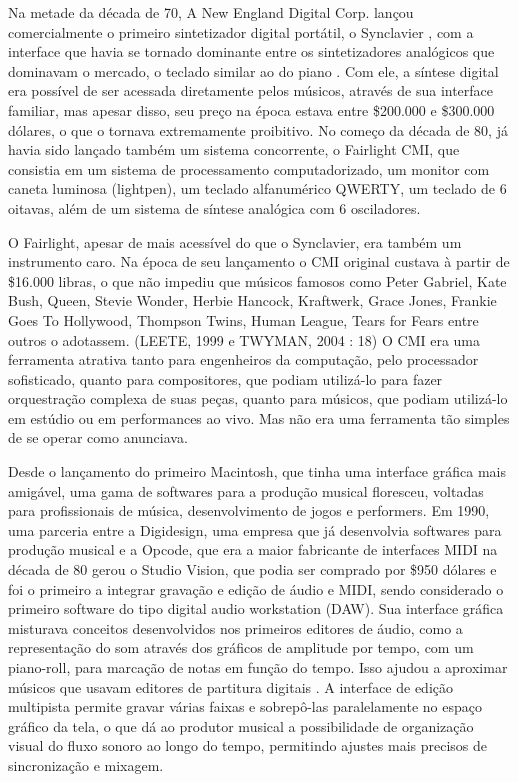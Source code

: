Na metade da década de 70, A New England Digital Corp. lançou comercialmente o primeiro sintetizador digital portátil, o Synclavier \cite[265]{Holmes1985}, com a interface que havia se tornado dominante entre os sintetizadores analógicos que dominavam o mercado, o teclado similar ao do piano \cite{JosephParadiso1998}. Com ele, a síntese digital era possível de ser acessada diretamente pelos músicos, através de sua interface familiar, mas apesar disso, seu preço na época estava entre \$200.000 e \$300.000 dólares, o que o tornava extremamente proibitivo. No começo da década de 80, já havia sido lançado também um sistema concorrente, o Fairlight CMI, que consistia em um sistema de processamento computadorizado, um monitor com caneta luminosa (lightpen), um teclado alfanumérico QWERTY, um teclado de 6 oitavas, além de um sistema de síntese analógica com 6 osciladores.

O Fairlight, apesar de mais acessível do que o Synclavier, era também um instrumento caro. Na época de seu lançamento o CMI original custava à partir de \$16.000 libras, o que não impediu que músicos famosos como Peter Gabriel, Kate Bush, Queen, Stevie Wonder, Herbie Hancock, Kraftwerk, Grace Jones, Frankie Goes To Hollywood, Thompson Twins, Human League, Tears for Fears entre outros o adotassem. \cite[18]{Twyman2004}(LEETE, 1999 e TWYMAN, 2004 : 18) O CMI era uma ferramenta atrativa tanto para engenheiros da computação, pelo processador sofisticado, quanto para compositores, que podiam utilizá-lo para fazer orquestração complexa de suas peças, quanto para músicos, que podiam utilizá-lo em estúdio ou em performances ao vivo. Mas não era uma ferramenta tão simples de se operar como anunciava. \cite[55]{Twyman2004}

Desde o lançamento do primeiro Macintosh, que tinha uma interface gráfica mais amigável, uma gama de softwares para a produção musical floresceu, voltadas para profissionais de música, desenvolvimento de jogos e performers. Em 1990, uma parceria entre a Digidesign, uma empresa que já desenvolvia softwares para produção musical e a Opcode, que era a maior fabricante de interfaces MIDI na década de 80 gerou o Studio Vision, que podia ser comprado por \$950 dólares e foi o primeiro a integrar gravação e edição de áudio e MIDI, sendo considerado o primeiro software do tipo digital audio workstation (DAW). Sua interface gráfica misturava conceitos desenvolvidos nos primeiros editores de áudio, como a representação do som através dos gráficos de amplitude por tempo, com um piano-roll, para marcação de notas em função do tempo. Isso ajudou a aproximar músicos que usavam editores de partitura digitais \cite{ChrisHalaby2011}. A interface de edição multipista permite gravar várias faixas e sobrepô-las paralelamente no espaço gráfico da tela, o que dá ao produtor musical a possibilidade de organização visual do fluxo sonoro ao longo do tempo, permitindo ajustes mais precisos de sincronização e mixagem.

